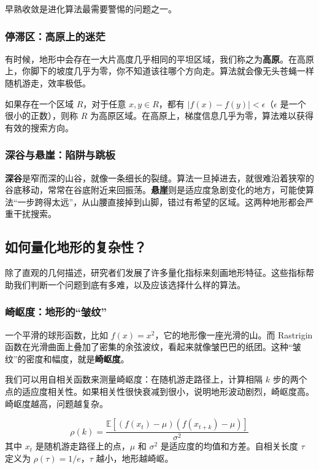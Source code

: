 \documentclass[lang=cn,zihao=-4,a4paper,fontset=windows]{beautybook}
\begin{document}
早熟收敛是进化算法最需要警惕的问题之一。

\subsubsection{停滞区：高原上的迷茫}

有时候，地形中会存在一大片高度几乎相同的平坦区域，我们称之为\textbf{高原}。在高原上，你脚下的坡度几乎为零，你不知道该往哪个方向走。算法就会像无头苍蝇一样随机游走，效率极低。

\begin{definition}[][高原区域]
如果存在一个区域 $R$，对于任意 $x, y \in R$，都有 $|f(x) - f(y)| < \epsilon$（$\epsilon$ 是一个很小的正数），则称 $R$ 为高原区域。在高原上，梯度信息几乎为零，算法难以获得有效的搜索方向。
\end{definition}

\subsubsection{深谷与悬崖：陷阱与跳板}

\textbf{深谷}是窄而深的山谷，就像一条细长的裂缝。算法一旦掉进去，就很难沿着狭窄的谷底移动，常常在谷底附近来回振荡。\textbf{悬崖}则是适应度急剧变化的地方，可能使算法“一步跨得太远”，从山腰直接掉到山脚，错过有希望的区域。这两种地形都会严重干扰搜索。

\subsection{如何量化地形的复杂性？}

除了直观的几何描述，研究者们发展了许多量化指标来刻画地形特征。这些指标帮助我们判断一个问题到底有多难，以及应该选择什么样的算法。

\subsubsection{崎岖度：地形的“皱纹”}

一个平滑的球形函数，比如 $f(x) = x^2$，它的地形像一座光滑的山。而 Rastrigin 函数在光滑曲面上叠加了密集的余弦波纹，看起来就像皱巴巴的纸团。这种“皱纹”的密度和幅度，就是\textbf{崎岖度}。

我们可以用自相关函数来测量崎岖度：在随机游走路径上，计算相隔 $k$ 步的两个点的适应度相关性。如果相关性很快衰减到很小，说明地形波动剧烈，崎岖度高。崎岖度越高，问题越复杂。

\[
\rho(k) = \frac{\mathbb{E}[(f(x_t) - \mu)(f(x_{t+k}) - \mu)]}{\sigma^2}
\]
其中 $x_t$ 是随机游走路径上的点，$\mu$ 和 $\sigma^2$ 是适应度的均值和方差。自相关长度 $\tau$ 定义为 $\rho(\tau) = 1/e$，$\tau$ 越小，地形越崎岖。
\end{document}
